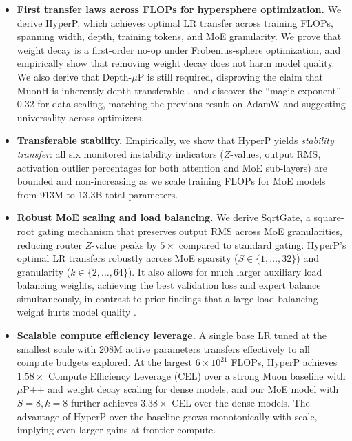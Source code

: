 \documentclass{article}
\begin{document}
\begin{itemize}[leftmargin=1.5em,itemsep=2pt]

    \item \textbf{First transfer laws across FLOPs for hypersphere optimization.} We derive HyperP, which achieves optimal LR transfer across training FLOPs, spanning width, depth, training tokens, and MoE granularity. We prove that weight decay is a first-order no-op under Frobenius-sphere optimization, and empirically show that removing weight decay does not harm model quality. We also derive that Depth-$\mu$P \cite{yang2023tensor} is still required, disproving the claim that MuonH is inherently depth-transferable \cite{wen2025hyperball_part1}, and discover the ``magic exponent'' 0.32 for data scaling, matching the previous result on AdamW \cite{bjorck2025scaling} and suggesting universality across optimizers.

    \item \textbf{Transferable stability.} Empirically, we show that HyperP yields \emph{stability transfer}: all six monitored instability indicators ($Z$-values, output RMS, activation outlier percentages for both attention and MoE sub-layers) are bounded and non-increasing as we scale training FLOPs for MoE models from 913M to 13.3B total parameters.

    \item \textbf{Robust MoE scaling and load balancing.} We derive SqrtGate, a square-root gating mechanism that preserves output RMS across MoE granularities, reducing router $Z$-value peaks by $5\times$ compared to standard gating. HyperP's optimal LR transfers robustly across MoE sparsity ($S \in \{1,\ldots,32\}$) and granularity ($k \in \{2,\ldots,64\}$). It also allows for much larger auxiliary load balancing weights, achieving the best validation loss and expert balance simultaneously, in contrast to prior findings that a large load balancing weight hurts model quality \cite{lin2024auxloss}.

    \item \textbf{Scalable compute efficiency leverage.}
     A single base LR tuned at the smallest scale with 208M active parameters transfers effectively to all compute budgets explored. At the largest $6\times 10^{21}$ FLOPs, HyperP achieves $1.58\times$ Compute Efficiency Leverage (CEL) \cite{kaplan2020scaling,team2025every} over a strong Muon baseline with $\mu$P++ and weight decay scaling for dense models, and our MoE model with $S=8, k=8$ further achieves $3.38\times$ CEL over the dense models. The advantage of HyperP over the baseline grows monotonically with scale, implying even larger gains at frontier compute.


\end{itemize}
\end{document}
